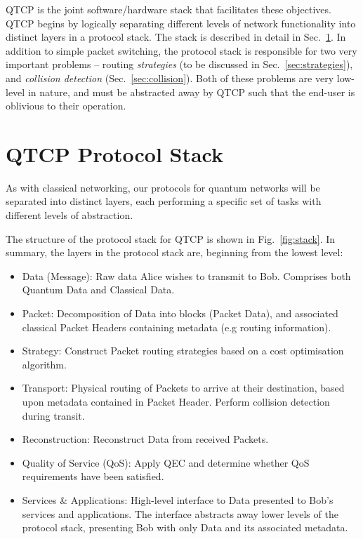 \documentclass[aps,rmp,twocolumn,amsmath,amssymb,nofootinbib,superscriptaddress]{revtex4}
\begin{document}
QTCP is the joint software/hardware stack that facilitates these objectives. QTCP begins by logically separating different levels of network functionality into distinct layers in a protocol stack. The stack is described in detail in Sec.~\ref{sec:prot_stack}. In addition to simple packet switching, the protocol stack is responsible for two very important problems -- routing \emph{strategies} (to be discussed in Sec.~\ref{sec:strategies}), and \emph{collision detection} (Sec.~\ref{sec:collision}). Both of these problems are very low-level in nature, and must be abstracted away by QTCP such that the end-user is oblivious to their operation.

%
%

\section{QTCP Protocol Stack} \label{sec:prot_stack}

As with classical networking, our protocols for quantum networks will be separated into distinct layers, each performing a specific set of tasks with different levels of abstraction.

The structure of the protocol stack for QTCP is shown in Fig.~\ref{fig:stack}. In summary, the layers in the protocol stack are, beginning from the lowest level:
\begin{itemize}
\item {\sc Data (Message)}: Raw data Alice wishes to transmit to Bob. Comprises both {\sc Quantum Data} and {\sc Classical Data}.
\item {\sc Packet}: Decomposition of {\sc Data} into blocks ({\sc Packet Data}), and associated classical {\sc Packet Headers} containing metadata (e.g routing information).
\item {\sc Strategy}: Construct {\sc Packet} routing strategies based on a cost optimisation algorithm.
\item {\sc Transport}: Physical routing of {\sc Packets} to arrive at their destination, based upon metadata contained in {\sc Packet Header}. Perform collision detection during transit.
\item {\sc Reconstruction}: Reconstruct {\sc Data} from received {\sc Packets}.
\item {\sc Quality of Service (QoS)}: Apply QEC and determine whether {\sc QoS} requirements have been satisfied.
\item {\sc Services \& Applications}: High-level interface to {\sc Data} presented to Bob's services and applications. The interface abstracts away lower levels of the protocol stack, presenting Bob with only {\sc Data} and its associated metadata.
\end{itemize}
\end{document}
